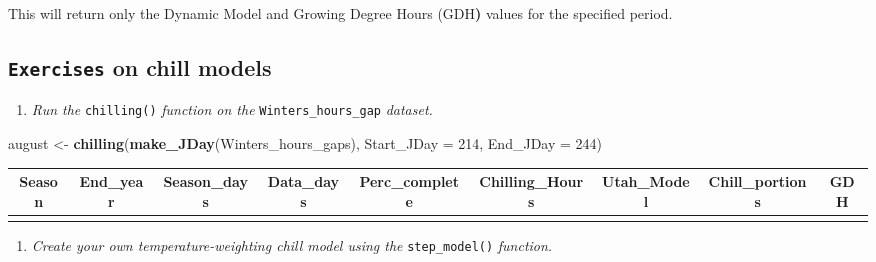 \documentclass[
]{article}
\newenvironment{Shaded}{\begin{snugshade}}{\end{snugshade}}
\newcommand{\AttributeTok}[1]{\textcolor[rgb]{0.13,0.29,0.53}{#1}}
\newcommand{\DecValTok}[1]{\textcolor[rgb]{0.00,0.00,0.81}{#1}}
\newcommand{\FunctionTok}[1]{\textcolor[rgb]{0.13,0.29,0.53}{\textbf{#1}}}
\newcommand{\NormalTok}[1]{#1}
\newcommand{\OtherTok}[1]{\textcolor[rgb]{0.56,0.35,0.01}{#1}}
\providecommand{\tightlist}{%
  \setlength{\itemsep}{0pt}\setlength{\parskip}{0pt}}
\begin{document}
This will return only the Dynamic Model and Growing Degree Hours (GDH\textbf{)} values for the specified period.

\subsection{\texorpdfstring{\texttt{Exercises} on chill models}{Exercises on chill models}}\label{exercises-on-chill-models}

\begin{enumerate}
\def\labelenumi{\arabic{enumi}.}
\tightlist
\item
  \emph{Run the} \texttt{chilling()} \emph{function on the} \texttt{Winters\_hours\_gap} \emph{dataset.}
\end{enumerate}

\begin{Shaded}
\begin{Highlighting}[]
\NormalTok{august }\OtherTok{\textless{}{-}} \FunctionTok{chilling}\NormalTok{(}\FunctionTok{make\_JDay}\NormalTok{(Winters\_hours\_gaps), }\AttributeTok{Start\_JDay =} \DecValTok{214}\NormalTok{, }\AttributeTok{End\_JDay =} \DecValTok{244}\NormalTok{)}
\end{Highlighting}
\end{Shaded}

\begin{table}
\centering\begingroup\fontsize{15}{17}\selectfont

\begin{tabular}{c|c|c|c|c|c|c|c|c}
\hline
Season & End\_year & Season\_days & Data\_days & Perc\_complete & Chilling\_Hours & Utah\_Model & Chill\_portions & GDH\\
\hline
\cellcolor{gray!10}{2007/2008} & \cellcolor{gray!10}{2008} & \cellcolor{gray!10}{31} & \cellcolor{gray!10}{31} & \cellcolor{gray!10}{100} & \cellcolor{gray!10}{0} & \cellcolor{gray!10}{-569.5} & \cellcolor{gray!10}{0} & \cellcolor{gray!10}{9933.327}\\
\hline
\end{tabular}
\endgroup{}
\end{table}

\begin{enumerate}
\def\labelenumi{\arabic{enumi}.}
\setcounter{enumi}{1}
\tightlist
\item
  \emph{Create your own temperature-weighting chill model using the} \texttt{step\_model()} \emph{function.}
\end{enumerate}
\end{document}
